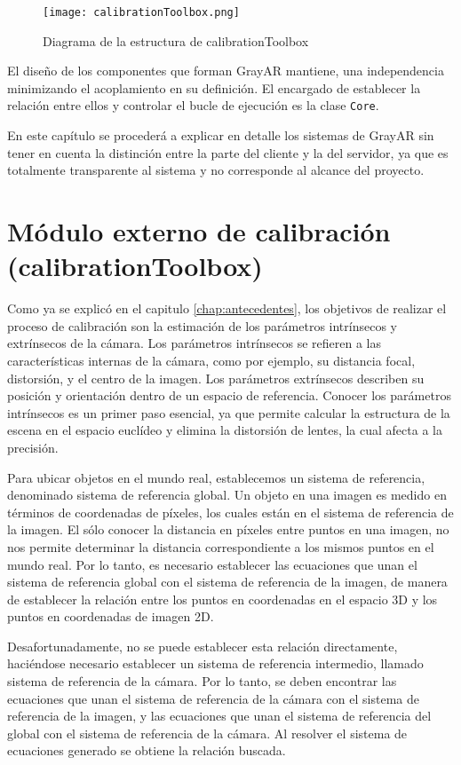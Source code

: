 \begin{figure} 
  \centering
  \texttt{[image: calibrationToolbox.png]}
  \caption{Diagrama de la estructura de calibrationToolbox}
  \label{fig:GrayAR_calibrationToolbox}
\end{figure}

El diseño de los componentes que forman GrayAR mantiene, una independencia minimizando el acoplamiento en su definición. El encargado de establecer la relación entre ellos y controlar el bucle de ejecución es la clase \texttt{Core}.  

En este capítulo se procederá a explicar en detalle los sistemas de GrayAR sin tener en cuenta la distinción entre la parte del cliente y la del servidor, ya que es totalmente transparente al sistema y no corresponde al alcance del proyecto.
 
\section{Módulo externo de calibración (calibrationToolbox)}
Como ya se explicó en el capitulo \ref{chap:antecedentes}, los objetivos de realizar el proceso de calibración son la estimación de los parámetros intrínsecos y extrínsecos de la cámara. Los parámetros intrínsecos se refieren a las características internas de la cámara, como por ejemplo, su distancia focal, distorsión, y el centro de la imagen. Los parámetros extrínsecos describen su posición y orientación dentro de un espacio de referencia. 
Conocer los parámetros intrínsecos es un primer paso esencial, ya que permite calcular la estructura de la escena en el espacio euclídeo y elimina la distorsión de lentes, la cual afecta a la precisión.

Para ubicar objetos en el mundo real, establecemos un sistema de referencia, denominado sistema de referencia global. Un objeto en una imagen es medido en términos de coordenadas de píxeles, los cuales están en el sistema de referencia de la imagen. El sólo conocer la distancia en píxeles entre puntos en una imagen, no nos permite determinar la distancia correspondiente a los mismos puntos en el mundo real. Por lo tanto, es necesario establecer las ecuaciones que unan el sistema de referencia global con el sistema de referencia de la imagen, de manera de establecer la relación entre los puntos en coordenadas en el espacio 3D y los puntos en coordenadas de imagen 2D. 

Desafortunadamente, no se puede establecer esta relación directamente, haciéndose necesario establecer un sistema de referencia intermedio, llamado sistema de referencia de la cámara. Por lo tanto, se deben encontrar las ecuaciones que unan el sistema de referencia de la cámara con el sistema de referencia de la imagen, y las ecuaciones que unan el sistema  de referencia del global con el sistema de referencia de la cámara. Al resolver el sistema de ecuaciones generado se obtiene la relación buscada.

